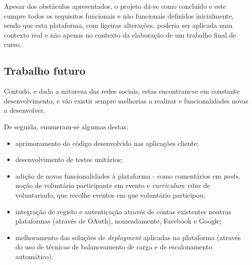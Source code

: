 \par \medskip

Apesar dos obstáculos apresentados, o projeto dá-se como concluído e este cumpre todos os requisitos funcionais e não funcionais definidos inicialmente, sendo que esta plataforma, com ligeiras alterações, poderia ser aplicada num contexto real e não apenas no contexto da elaboração de um trabalho final de curso. 

\newpage

\subsection{Trabalho futuro}

Contudo, e dada a natureza das redes sociais, estas encontram-se em constante desenvolvimento, e vão existir sempre melhorias a realizar e funcionalidades novas a desenvolver.

\par \medskip

De seguida, enumeram-se algumas destas:

\begin{itemize}
	\item aprimoramento do código desenvolvido nas aplicações cliente;
	\item desenvolvimento de testes unitários;
	\item adição de novas funcionalidades à plataforma - como comentários em \textit{posts}, noção de voluntário participante em evento e \textit{curriculum vitae} de voluntariado, que recolhe eventos em que voluntário participou;
	\item integração de registo e autenticação através de contas existentes noutras plataformas (através de OAuth), nomeadamente, Facebook e Google; 
	\item melhoramento das soluções de \textit{deployment} aplicadas na plataforma (através do uso de técnicas de balanceamento de carga e de escalonamento automático).
\end{itemize}